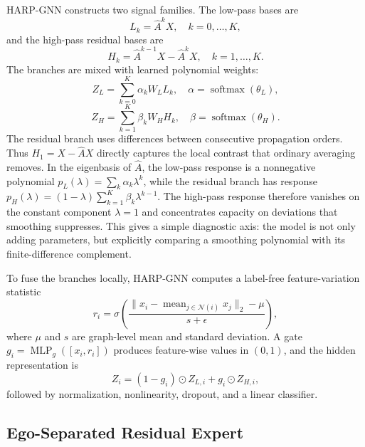 \documentclass[letterpaper]{article} %
\newcommand{\base}{HARP-GNN}
\begin{document}
\base{} constructs two signal families.
The low-pass bases are
\begin{equation}
  L_k=\hat{A}^{k}X,\quad k=0,\ldots,K,
\end{equation}
and the high-pass residual bases are
\begin{equation}
  H_k=\hat{A}^{k-1}X-\hat{A}^{k}X,\quad k=1,\ldots,K.
\end{equation}
The branches are mixed with learned polynomial weights:
\begin{equation}
  Z_L=\sum_{k=0}^{K}\alpha_k W_LL_k,\quad
  \alpha=\operatorname{softmax}(\theta_L),
\end{equation}
\begin{equation}
  Z_H=\sum_{k=1}^{K}\beta_k W_HH_k,\quad
  \beta=\operatorname{softmax}(\theta_H).
\end{equation}
The residual branch uses differences between consecutive propagation orders.
Thus $H_1=X-\hat{A}X$ directly captures the local contrast that ordinary averaging removes.
In the eigenbasis of $\hat{A}$, the low-pass response is a nonnegative polynomial
$p_L(\lambda)=\sum_k \alpha_k\lambda^k$, while the residual branch has response
$p_H(\lambda)=(1-\lambda)\sum_{k=1}^{K}\beta_k\lambda^{k-1}$.
The high-pass response therefore vanishes on the constant component $\lambda=1$ and concentrates capacity on deviations that smoothing suppresses.
This gives a simple diagnostic axis: the model is not only adding parameters, but explicitly comparing a smoothing polynomial with its finite-difference complement.

To fuse the branches locally, \base{} computes a label-free feature-variation statistic
\begin{equation}
  r_i=\sigma\left(
  \frac{\|x_i-\operatorname{mean}_{j\in\mathcal{N}(i)}x_j\|_2-\mu}{s+\epsilon}
  \right),
\end{equation}
where $\mu$ and $s$ are graph-level mean and standard deviation.
A gate $g_i=\operatorname{MLP}_g([x_i,r_i])$ produces feature-wise values in $(0,1)$, and the hidden representation is
\begin{equation}
  Z_i=(1-g_i)\odot Z_{L,i}+g_i\odot Z_{H,i},
\end{equation}
followed by normalization, nonlinearity, dropout, and a linear classifier.

\subsection{Ego-Separated Residual Expert}
\end{document}
